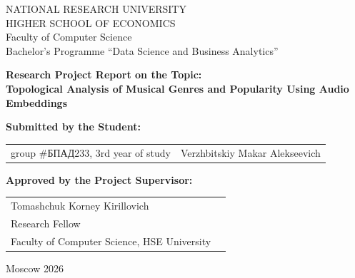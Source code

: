 \begin{titlepage}
\newpage

{
\begin{center}
NATIONAL RESEARCH UNIVERSITY\\
HIGHER SCHOOL OF ECONOMICS\\
\bigskip
Faculty of Computer Science\\
Bachelor’s Programme “Data Science and Business Analytics”
\end{center}
}

\begin{center}
{\bf Research Project Report on the Topic:}\\
{\bf Topological Analysis of Musical Genres and Popularity Using Audio Embeddings}\\
\end{center}

\vspace{2em}

{\bf Submitted by the Student: \vspace{2mm}}

{
\begin{tabular}{l@{\hskip 1.5cm}l}
group \#\textrussian{БПАД}233, 3rd year of study & 
Verzhbitskiy Makar Alekseevich \\
\end{tabular}}

\vspace{1em}
{\bf Approved by the Project Supervisor: \vspace{2mm}}

{
\begin{tabular}{l@{\hskip 1.5cm}l}
Tomashchuk Korney Kirillovich\\
Research Fellow\\
Faculty of Computer Science, HSE University 
\end{tabular}}

\vspace{\fill}

\begin{center}
Moscow 2026
\end{center}

\end{titlepage}